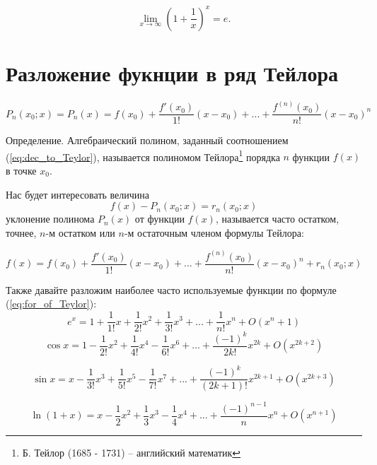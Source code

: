 \documentclass[a4paper, 12pt]{extarticle} %
\begin{document}
\begin{equation}
    \lim _{{x\to \infty }}\left(1+{\frac  {1}{x}}\right)^{x}=e.
\end{equation}

\clearpage


\section*{Разложение фукнции в ряд Тейлора}

\begin{equation}
    P_n(x_0; x) = P_n(x) = f(x_0) + \frac{f'(x_0)}{1!}(x - x_0) + ... + \frac{f^{(n)}(x_0)}{n!}(x - x_0)^n
    \label{eq:dec_to_Teylor}
\end{equation}

Определение. Алгебраический полином, заданный соотношением (\ref{eq:dec_to_Teylor}), называется полиномом Тейлора\footnote{Б. Тейлор (1685 - 1731) -- английский математик} порядка $n$ функции $f(x)$ в точке $x_0$.

Нас будет интересовать величина
\begin{equation}
    f(x) - P_n(x_0; x) = r_n(x_0; x)
\end{equation}
уклонение полинома $P_n(x)$ от функции $f(x)$, называется часто остатком, точнее, $n$-м остатком или $n$-м остаточным членом формулы Тейлора:

\begin{equation}
    f(x) = f(x_0) + \frac{f'(x_0)}{1!} (x - x_0) + ... + \frac{f^{(n)}(x_0)}{n!} (x - x_0)^n + r_n (x_0; x)
    \label{eq:for_of_Teylor}
\end{equation}

Также давайте разложим наиболее часто используемые функции по формуле (\ref{eq:for_of_Teylor}):
\begin{equation}
    e^x = 1 + \frac{1}{1!}x + \frac{1}{2!}x^2 + \frac{1}{3!}x^3 + ... + \frac{1}{n!}x^n + O(x^n + 1)
\end{equation}
\begin{equation}
    \cos x = 1 - \frac{1}{2!}x^2 + \frac{1}{4!}x^4 - \frac{1}{6!}x^6 + ... + \frac{(-1)^k}{2k!}x^{2k} + O(x^{2k+2})
\end{equation}

\begin{equation}
    \sin x = x - \frac{1}{3!}x^3 + \frac{1}{5!}x^5 - \frac{1}{7!}x^7 + ... + \frac{(-1)^k}{(2k + 1)!}x^{2k + 1} + O(x^{2k+3})
\end{equation}

\begin{equation}
    \ln(1 + x) = x - \frac{1}{2}x^2 + \frac{1}{3}x^3 - \frac{1}{4}x^4 + ... + \frac{(-1)^{n - 1}}{n}x^n + O(x^{n + 1})
\end{equation}
\end{document}
